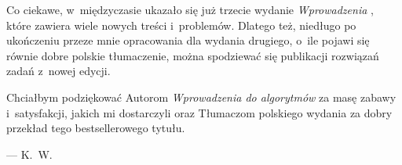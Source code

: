 Co ciekawe, w~międzyczasie ukazało się już trzecie wydanie \textsl{Wprowadzenia} \cite{cormen3}, które zawiera wiele nowych treści i~problemów. Dlatego też, niedługo po ukończeniu przeze mnie opracowania dla wydania drugiego, o~ile pojawi się równie dobre polskie tłumaczenie, można spodziewać się publikacji rozwiązań zadań z~nowej edycji.

Chciałbym podziękować Autorom \textsl{Wprowadzenia do algorytmów} za masę zabawy i~satysfakcji, jakich mi dostarczyli oraz Tłumaczom polskiego wydania za dobry przekład tego bestsellerowego tytułu.

\bigskip
{}\hfill--- K.~W.

\endinput
